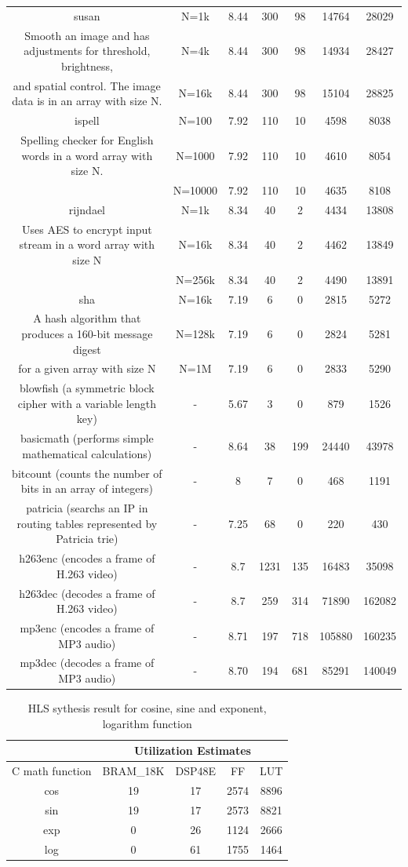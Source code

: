 \documentclass[conference]{IEEEtran}
\begin{document}
\begin{table}[!t]
\begin{tabular}{|c|c|c|c|c|c|c|}
\hline
susan & N=1k & 8.44 & 300 & 98 & 14764 & 28029\tabularnewline
\cline{2-7}
Smooth an image and has adjustments for threshold, brightness,  & N=4k & 8.44 & 300 & 98 & 14934 & 28427\tabularnewline
\cline{2-7}
and spatial control. The image data is in an array with size N. & N=16k & 8.44 & 300 & 98 & 15104 & 28825\tabularnewline
\hline
ispell & N=100 & 7.92 & 110 & 10 & 4598 & 8038\tabularnewline
\cline{2-7}
Spelling checker for English words in a word array with size N. & N=1000 & 7.92 & 110 & 10 & 4610 & 8054\tabularnewline
\cline{2-7}
 & N=10000 & 7.92 & 110 & 10 & 4635 & 8108\tabularnewline
\hline
rijndael & N=1k & 8.34 & 40 & 2 & 4434 & 13808\tabularnewline
\cline{2-7}
Uses AES to encrypt input stream in a word array with size N  & N=16k & 8.34 & 40 & 2 & 4462 & 13849\tabularnewline
\cline{2-7}
 & N=256k & 8.34 & 40 & 2 & 4490 & 13891\tabularnewline
\hline
sha & N=16k & 7.19 & 6 & 0 & 2815 & 5272\tabularnewline
\cline{2-7}
A hash algorithm that produces a 160-bit message digest & N=128k & 7.19 & 6 & 0 & 2824 & 5281\tabularnewline
\cline{2-7}
for a given array with size N & N=1M & 7.19 & 6 & 0 & 2833 & 5290\tabularnewline
\hline
blowfish (a symmetric block cipher with a variable length key) & - & 5.67 & 3 & 0 & 879 & 1526\tabularnewline
\hline
basicmath (performs simple mathematical calculations) & - & 8.64 & 38 & 199 & 24440 & 43978\tabularnewline
\hline
bitcount (counts the number of bits in an array of integers) & - & 8 & 7 & 0 & 468 & 1191\tabularnewline
\hline
patricia (searchs an IP in routing tables represented by Patricia trie) & - & 7.25 & 68 & 0 & 220 & 430\tabularnewline
\hline
h263enc (encodes a frame of H.263 video) & - & 8.7 & 1231 & 135 & 16483 & 35098\tabularnewline
\hline
h263dec (decodes a frame of H.263 video) & - & 8.7 & 259 & 314 & 71890 & 162082\tabularnewline
\hline
mp3enc (encodes a frame of MP3 audio) & - & 8.71 & 197 & 718  & 105880  & 160235\tabularnewline
\hline
mp3dec (decodes a frame of MP3 audio) & - & 8.70 & 194 & 681 & 85291 & 140049\tabularnewline
\hline
\end{tabular}


\end{table}

\begin{table}
\caption{HLS sythesis result for cosine, sine and exponent, logarithm function}\label{table_cos_sine}


\begin{tabular}{|c|c|c|c|c|}
\hline
 & \multicolumn{4}{c|}{Utilization Estimates}\tabularnewline
\hline
C math function & BRAM\_18K  & DSP48E  & FF & LUT\tabularnewline
\hline
\hline
cos & 19 & 17 & 2574 & 8896\tabularnewline
\hline
sin & 19 & 17 & 2573 & 8821\tabularnewline
\hline
exp & 0 & 26 & 1124 & 2666\tabularnewline
\hline
log & 0 & 61 & 1755 & 1464\tabularnewline
\hline
\end{tabular}
\end{table}
\end{document}
